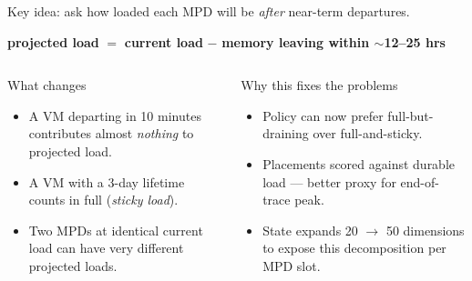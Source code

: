 \documentclass[11pt,aspectratio=43]{beamer}
\begin{document}
\begin{frame}{Key idea: ask how loaded each MPD will be \emph{after} near-term departures.}

  \vspace{0.2em}

  \begin{center}
    \large
    \textbf{projected load} $=$ \textbf{current load} $-$ \textbf{memory leaving within $\sim$12--25 hrs}
  \end{center}

  \vspace{0.4em}

  \begin{columns}[T,onlytextwidth]
      \begin{block}{What changes}
        \small
        \begin{itemize}
          \setlength{\itemsep}{0.2em}
          \item A VM departing in 10 minutes contributes almost
                \emph{nothing} to projected load.
          \item A VM with a 3-day lifetime counts in full
                (\emph{sticky load}).
          \item Two MPDs at identical current load can have
                very different projected loads.
        \end{itemize}
      \end{block}

      \begin{block}{Why this fixes the problems}
        \small
        \begin{itemize}
          \setlength{\itemsep}{0.2em}
          \item Policy can now prefer full-but-draining
                over full-and-sticky.
          \item Placements scored against durable load ---
                better proxy for end-of-trace peak.
          \item State expands 20 $\to$ 50 dimensions to
                expose this decomposition per MPD slot.
        \end{itemize}
      \end{block}
  \end{columns}

\end{frame}

\end{document}
